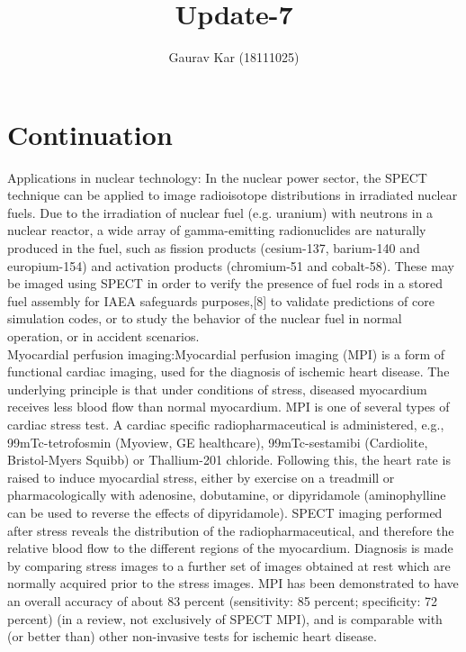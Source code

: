 \documentclass{article}
\title{Update-7}
\author{Gaurav Kar (18111025)}
\date{}
\begin{document}
\maketitle

\section{Continuation}
Applications in nuclear technology: In the nuclear power sector, the SPECT technique can be applied to image radioisotope distributions in irradiated nuclear fuels. Due to the irradiation of nuclear fuel (e.g. uranium) with neutrons in a nuclear reactor, a wide array of gamma-emitting radionuclides are naturally produced in the fuel, such as fission products (cesium-137, barium-140 and europium-154) and activation products (chromium-51 and cobalt-58). These may be imaged using SPECT in order to verify the presence of fuel rods in a stored fuel assembly for IAEA safeguards purposes,[8] to validate predictions of core simulation codes, or to study the behavior of the nuclear fuel in normal operation, or in accident scenarios.\\Myocardial perfusion imaging:Myocardial perfusion imaging (MPI) is a form of functional cardiac imaging, used for the diagnosis of ischemic heart disease. The underlying principle is that under conditions of stress, diseased myocardium receives less blood flow than normal myocardium. MPI is one of several types of cardiac stress test. A cardiac specific radiopharmaceutical is administered, e.g., 99mTc-tetrofosmin (Myoview, GE healthcare), 99mTc-sestamibi (Cardiolite, Bristol-Myers Squibb) or Thallium-201 chloride. Following this, the heart rate is raised to induce myocardial stress, either by exercise on a treadmill or pharmacologically with adenosine, dobutamine, or dipyridamole (aminophylline can be used to reverse the effects of dipyridamole). SPECT imaging performed after stress reveals the distribution of the radiopharmaceutical, and therefore the relative blood flow to the different regions of the myocardium. Diagnosis is made by comparing stress images to a further set of images obtained at rest which are normally acquired prior to the stress images. MPI has been demonstrated to have an overall accuracy of about 83 percent (sensitivity: 85 percent; specificity: 72 percent) (in a review, not exclusively of SPECT MPI), and is comparable with (or better than) other non-invasive tests for ischemic heart disease.
\end{document}
